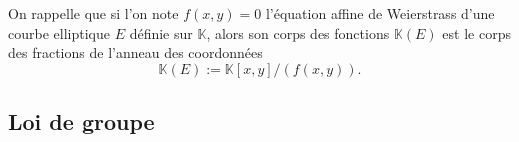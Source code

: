 \documentclass[10pt,a4paper]{book}
\theoremstyle{plain}
\theoremstyle{definition}
\theoremstyle{definition}
\theoremstyle{definition}
\theoremstyle{definition}
\theoremstyle{definition}
\theoremstyle{remark}
\theoremstyle{remark}
\theoremstyle{definition}
\begin{document}
On rappelle que si l'on note $f(x,y)=0$ l'équation affine de Weierstrass d'une 
courbe elliptique $E$ définie sur $\mathbb{K}$, alors son corps des fonctions 
$\mathbb{K}(E)$ est le corps des fractions de l'anneau des coordonnées
\begin{equation*}
\mathbb{K}(E):=\mathbb{K}[x,y]/(f(x,y)).
\end{equation*}

\subsection{Loi de groupe}
%
\end{document}
